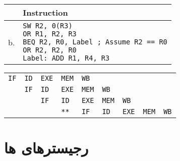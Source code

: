 \documentclass[11pt, dvipsnames, svgnames, x11names]{article}
\begin{document}
\begin{latin}
\begin{table}[H]
\begin{center}
\begin{tabular}{|c|l|}
\hline
& Instruction \\
\hline
b. &
\makecell[l]{
\texttt{SW R2, 0(R3)} \\ 
\texttt{OR R1, R2, R3} \\ 
\texttt{BEQ R2, R0, Label ; Assume R2 == R0} \\
\texttt{OR R2, R2, R0} \\
\texttt{Label: ADD R1, R4, R3}}\\
\hline
\end{tabular}
\end{center}
\end{table}
\end{latin}
\begin{latin}
\begin{table}[H]
\begin{center}
\begin{tabular}{|p{0.5cm}p{0.5cm}p{0.5cm}p{0.5cm}p{0.5cm}p{0.5cm}p{0.5cm}p{0.5cm}p{0.5cm}|}
\hline
\texttt{IF}&
\texttt{ID}&
\texttt{EXE}&
\texttt{MEM}&
\texttt{WB}&
&
&
&
\\
&
\texttt{IF}&
\texttt{ID}&
\texttt{EXE}&
\texttt{MEM}&
\texttt{WB}&
&
&
\\
&
&
\texttt{IF}&
\texttt{ID}&
\texttt{EXE}&
\texttt{MEM}&
\texttt{WB}&
&
\\
&
&
&
\texttt{**}&
\texttt{IF}&
\texttt{ID}&
\texttt{EXE}&
\texttt{MEM}&
\texttt{WB} \\
\hline
\end{tabular}
\end{center}
\end{table}
\end{latin}

\newpage
\section{رجیستر‌های ها}
\end{document}
